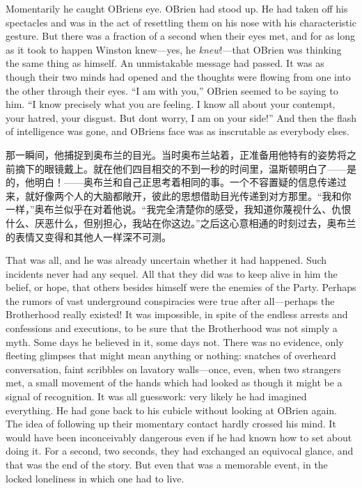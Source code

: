 \begin{paracol}{2}
Momentarily he caught O\textquotesingle Brien\textquotesingle s eye.
O\textquotesingle Brien had stood up. He had taken off his spectacles
and was in the act of resettling them on his nose with his
characteristic gesture. But there was a fraction of a second when their
eyes met, and for as long as it took to happen Winston knew---yes, he
\emph{knew}!---that O\textquotesingle Brien was thinking the same thing
as himself. An unmistakable message had passed. It was as though their
two minds had opened and the thoughts were flowing from one into the
other through their eyes. ``I am with you,'' O\textquotesingle Brien
seemed to be saying to him. ``I know precisely what you are feeling. I
know all about your contempt, your hatred, your disgust. But
don\textquotesingle t worry, I am on your side!'' And then the flash of
intelligence was gone, and O\textquotesingle Brien\textquotesingle s
face was as inscrutable as everybody else\textquotesingle s.

\switchcolumn

那一瞬间，他捕捉到奥布兰的目光。当时奥布兰站着，正准备用他特有的姿势将之前摘下的眼镜戴上。就在他们四目相交的不到一秒的时间里，温斯顿明白了——是的，他明白！——奥布兰和自己正思考着相同的事。一个不容置疑的信息传递过来，就好像两个人的大脑都敞开，彼此的思想借助目光传递到对方那里。``我和你一样，''奥布兰似乎在对着他说。``我完全清楚你的感受，我知道你蔑视什么、仇恨什么、厌恶什么，但别担心，我站在你这边。''之后这心意相通的时刻过去，奥布兰的表情又变得和其他人一样深不可测。

\switchcolumn*

That was all, and he was already uncertain whether it had happened. Such
incidents never had any sequel. All that they did was to keep alive in
him the belief, or hope, that others besides himself were the enemies of
the Party. Perhaps the rumors of vast underground conspiracies were true
after all---perhaps the Brotherhood really existed! It was impossible,
in spite of the endless arrests and confessions and executions, to be
sure that the Brotherhood was not simply a myth. Some days he believed
in it, some days not. There was no evidence, only fleeting glimpses that
might mean anything or nothing: snatches of overheard conversation,
faint scribbles on lavatory walls---once, even, when two strangers met,
a small movement of the hands which had looked as though it might be a
signal of recognition. It was all guesswork: very likely he had imagined
everything. He had gone back to his cubicle without looking at
O\textquotesingle Brien again. The idea of following up their momentary
contact hardly crossed his mind. It would have been inconceivably
dangerous even if he had known how to set about doing it. For a second,
two seconds, they had exchanged an equivocal glance, and that was the
end of the story. But even that was a memorable event, in the locked
loneliness in which one had to live.


\end{paracol}
